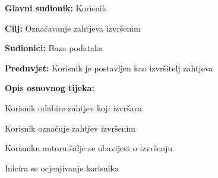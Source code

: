		
			\noindent {}
			\begin{packed_item}
				
				\item \textbf{Glavni sudionik: }Korisnik
				\item  \textbf{Cilj:} Označavanje zahtjeva izvršenim 
				\item  \textbf{Sudionici:} Baza podataka
				\item  \textbf{Preduvjet:} Korisnik je postavljen kao izvršitelj zahtjeva
				\item  \textbf{Opis osnovnog tijeka:}
				
				\item[] \begin{packed_enum}
					
					\item Korisnik odabire zahtjev koji izvršava
					\item Korisnik označuje zahtjev izvršenim
					\item Korisniku autoru šalje se obavijest o izvršenju
					\item Inicira se ocjenjivanje korisnika

				\end{packed_enum}
				
			\end{packed_item}
		
